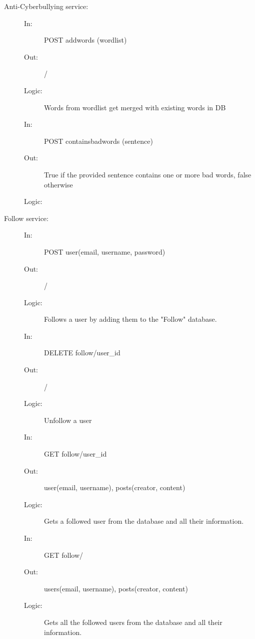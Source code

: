\documentclass{article}
\begin{document}
\begin{description}
    \item [Anti-Cyberbullying service:] 
    \begin{description}
        \item[]
        \item[In:] POST addwords (wordlist)
        \item[Out:] /
        \item[Logic:] Words from wordlist get merged with existing words in DB
        \item[]
        
        \item[In:] POST containsbadwords (sentence)
        \item[Out:] True if the provided sentence contains one or more bad words, false otherwise
        \item[Logic:] 
    \end{description}
\end{description}

\begin{description}
    \item [Follow service:] 
    \begin{description}
        \item[]
        \item[In:] POST user(email, username, password)
        \item[Out:] /
        \item[Logic:] Follows a user by adding them to the "Follow" database.
        \item[]
    \end{description}
    \begin{description}
        \item[]
        \item[In:] DELETE follow/user\_id
        \item[Out:] /
        \item[Logic:] Unfollow a user
        \item[]
    \end{description}
    \begin{description}
        \item[]
        \item[In:] GET follow/user\_id
        \item[Out:] user(email, username), posts(creator, content)
        \item[Logic:] Gets a followed user from the database and all their information.
        \item[]
    \end{description}
    \begin{description}
        \item[]
        \item[In:] GET follow/
        \item[Out:] users(email, username), posts(creator, content)
        \item[Logic:] Gets all the followed users from the database and all their information.
        \item[]
    \end{description}
\end{description}
\end{document}
